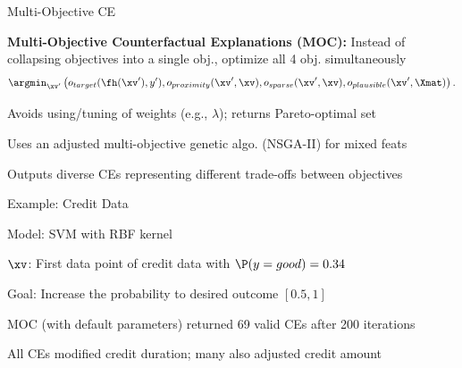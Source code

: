 \documentclass[10pt,compress,t,notes=noshow, xcolor=table]{beamer}
\begin{document}
\begin{framei}[align=top]{Multi-Objective CE }
\item \textbf{Multi-Objective Counterfactual Explanations (MOC):} Instead of collapsing objectives into a single obj., optimize all 4 obj. simultaneously
$$
\argmin_{\xv'} \left(o_{target}(\fh(\xv'), y'), o_{proximity}(\xv', \xv), o_{sparse}(\xv', \xv), o_{plausible}(\xv', \Xmat) \right).
$$
\item Avoids using/tuning of weights (e.g., $\lambda$); returns Pareto-optimal set
\item Uses an adjusted multi-objective genetic algo. (NSGA-II) for mixed feats %
\item Outputs diverse CEs representing different trade-offs between objectives
\end{framei}


\begin{framei}[align=top]{Example: Credit Data}
\item Model: SVM with RBF kernel
\item $\xv$: First data point of credit data with $\P(y = good) = 0.34$ %
\item Goal: Increase the probability to desired outcome $[0.5, 1]$
\item MOC (with default parameters) returned 69 valid CEs after 200 iterations%
\item All CEs modified credit duration; many also adjusted credit amount
\end{framei}
\end{document}
